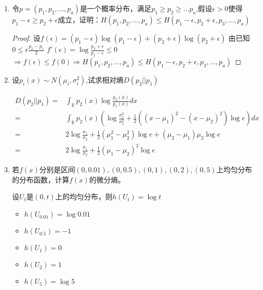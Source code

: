 \documentclass[a4paper]{article}
\begin{document}
\begin{enumerate}[label=\thehwcnt.\arabic*.]
\begin{proof}
\begin{align*}
=& H(X)+H(Y)-H(X,Y)-(H(X,Z)-H(Z))+H(X,Y,Z)-H(Y,Z)\\
=& H(X,Y,Z)-H(X)-H(Y)-H(Z)+(H(X)+H(Y)-H(X,Y))\\
+&(H(Y)+H(Z)-H(Y,Z))+(H(Z)+H(X)-H(X,Z))\\
=& H(X,Y,Z)-H(X)-H(Y)-H(Z)+I(X;Y)+I(Y;Z)+I(Z;X)
\end{align*}
\end{proof}
\item 令$p=(p_1,p_2,\dots,p_a)$是一个概率分布，满足$p_1\geq p_2\geq \dots p_a$,假设$\epsilon >0 $使得$p_1-\epsilon \geq p_2+\epsilon$成立，证明：$H(p_1,p_2,\dots,p_a)
\leq H(p_1-\epsilon,p_2+\epsilon,p_3,\dots,p_a)$
\begin{proof}
设$f(\epsilon)=(p_1-\epsilon)\log(p_1-\epsilon)+(p_2+\epsilon)\log(p_2+\epsilon)$
由已知$0\leq \epsilon \frac{p_2-p_1}{2}$
$f'(\epsilon)=\log\frac{p_2+\epsilon}{p_1-\epsilon}\leq 0$
$\Rightarrow f(\epsilon)\leq f(0)\Rightarrow H(p_1,p_2,\dots,p_a)\leq H(p_1-\epsilon,p_2+\epsilon,p_3,\dots,p_a)$
\end{proof}
\item 设$p_i(x)\sim N(\mu_i,\sigma_i^2)$,试求相对熵$D(p_2||p_1)$
\begin{solution}
\begin{align*}
D(p_2||p_1)=& \int_{\mathbb{R}} p_2(x) \log \frac{p_2(x)}{p_1(x)}dx\\
=& \int_{\mathbb{R}} p_2(x) \left(\log \frac{\sigma_1^2}{\sigma_2^2}+\frac{1}{2}((x-\mu_1)^2-(x-\mu_2)^2)\log e\right)dx\\
=& 2\log \frac{\sigma_1}{\sigma_2}+\frac{1}{2}(\mu_1^2-\mu_2^2)\log e+(\mu_2-\mu_1)\mu_2\log e\\
=& 2\log \frac{\sigma_1}{\sigma_2}+\frac{1}{2}(\mu_1-\mu_2)^2\log e
\end{align*}
\end{solution}
\item 若$f(x)$分别是区间$(0,0.01),(0,0.5),(0,1),(0,2),(0,5)$上均匀分布的分布函数，计算$f(x)$的微分熵。
\begin{solution}
设$U_t$是$(0,t)$上的均匀分布，则$h(U_t)=\log t$
\begin{itemize}
\item $h(U_{0.01})=\log 0.01$
\item $h(U_{0.5})=-1$
\item $h(U_{1})=0$
\item $h(U_{2})=1$
\item $h(U_{5})=\log 5$
\end{itemize}
\end{solution}

\end{enumerate}
\end{document}
